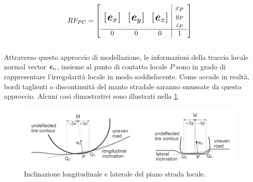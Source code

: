%
\begin{equation}
RF_{PC} = \left[
\begin{array}{ccc|c}
& & & x_P\\
\multirow{3}{*}{\raisebox{20mm}{\scalebox{1.5}{$\left[\textbf{\textit{e}}_x\right]$}}} & \multirow{3}{*}{\raisebox{20mm}{\scalebox{1.5}{$\left[\textbf{\textit{e}}_y\right]$}}} & \multirow{3}{*}{\raisebox{20mm}{\scalebox{1.5}{$\left[\textbf{\textit{e}}_z\right]$}}} & y_P\\
& & & z_P\\ \hline
0 & 0 & 0 & 1
\end{array}\right]
\end{equation}\\
Attraverso questo approccio di modellazione, le informazioni della traccia locale normal vector $\textbf{\textit{e}}_{n}$, insieme al punto di contatto locale $P$ sono in grado di rappresentare l'irregolarità locale in modo soddisfacente. Come accade in realtà, bordi taglienti o discontinuità del manto stradale saranno smussate da questo approccio. Alcuni casi dimostrativi sono illustrati nella \figurename{  \ref{localplane}}.

\begin{figure}[h]
	\centering
	\includegraphics[width=\linewidth]{Figures/local_plane}
	\caption{Inclinazione longitudinale e laterale del piano strada locale.}
	\label{localplane}
\end{figure}